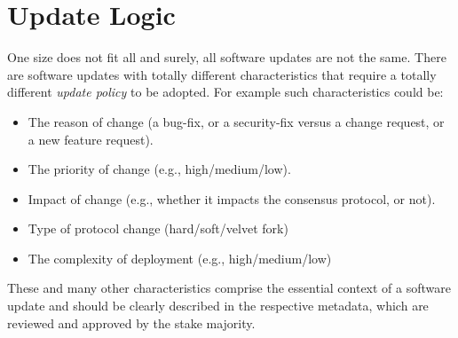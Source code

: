 \section{Update Logic}

One size does not fit all and surely, all software updates are not the same. There are software updates with totally different characteristics that require a totally different \emph{update policy} to be adopted. For example such characteristics could be:
\begin{itemize}
\item The reason of change (a bug-fix, or a security-fix versus a change request, or a new feature request).
\item The priority of change (e.g., high/medium/low).
\item Impact of change (e.g., whether it impacts the consensus protocol, or not).
\item Type of protocol change (hard/soft/velvet fork)
\item The complexity of deployment (e.g., high/medium/low)
\end{itemize}
These and many other characteristics comprise the essential context of a software update and should be clearly described in the respective metadata, which are reviewed and approved by the stake majority.

